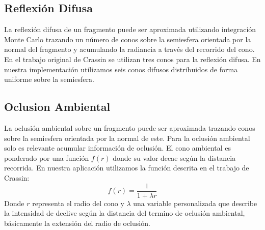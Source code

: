 \subsection{Reflexión Difusa}
La reflexión difusa de un fragmento puede ser aproximada utilizando integración Monte Carlo trazando un número de conos sobre la semiesfera orientada por la normal del fragmento y acumulando la radiancia a través del recorrido del cono. En el trabajo original de Crassin se utilizan tres conos para la reflexión difusa. En nuestra implementación utilizamos seis conos difusos distribuidos de forma uniforme sobre la semiesfera.
\subsection{Oclusion Ambiental}
\label{sub:occl_ambt_prop}
La oclusión ambiental sobre un fragmento puede ser aproximada trazando conos sobre la semiesfera orientada por la normal de este. Para la oclusión ambiental solo es relevante acumular información de oclusión. El cono ambiental es ponderado por una función $f(r)$ donde su valor decae según la distancia recorrida. En nuestra aplicación utilizamos la función descrita en el trabajo de Crassin:
\begin{equation}
	f(r) = \frac{1}{1+\lambda r}
\end{equation}
Donde $r$ representa el radio del cono y $\lambda$ una variable personalizada que describe la intensidad de declive según la distancia del termino de oclusión ambiental, básicamente la extensión del radio de oclusión.
